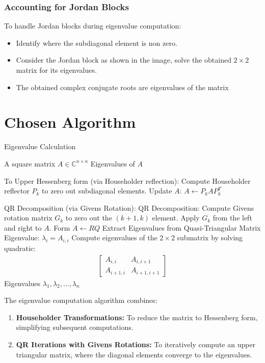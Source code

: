 \documentclass[12pt]{article}
\begin{document}
\subsubsection{Accounting for Jordan Blocks}
To handle Jordan blocks during eigenvalue computation:
\begin{itemize}
    \item Identify where the subdiagonal element is non zero.
    \item Consider the Jordan block as shown in the image, solve the obtained $2\times2$ matrix for its eigenvalues.
    \item The obtained complex conjugate roots are eigenvalues of the matrix
\end{itemize}

\section{Chosen Algorithm}
\begin{algorithm}[H]
\caption{Eigenvalue Calculation}
\begin{algorithmic}[1]
\REQUIRE A square matrix $A \in \mathbb{C}^{n \times n}$
\ENSURE Eigenvalues of $A$

\STATE To Upper Hessenberg form (via Householder reflection):
        \STATE Compute Householder reflector $P_k$ to zero out subdiagonal elements.
        \STATE Update $A$: $A \leftarrow P_k A P_k^T$
    \ENDFOR

\STATE QR Decomposition (via Givens Rotation):
    \STATE QR Decomposition:
            \STATE Compute Givens rotation matrix $G_k$ to zero out the $(k+1, k)$ element.
            \STATE Apply $G_k$ from the left and right to $A$.
        \ENDFOR
    \STATE Form $A \leftarrow R Q$
\ENDWHILE
\STATE Extract Eigenvalues from Quasi-Triangular Matrix
            \STATE Eigenvalue: $\lambda_i = A_{i, i}$
        \ELSE
            \STATE Compute eigenvalues of the $2 \times 2$ submatrix by solving quadratic:
            \begin{align*}
            \begin{bmatrix}
                A_{i, i} & A_{i, i+1} \\
                A_{i+1, i} & A_{i+1, i+1}
            \end{bmatrix}
            \end{align*}
        \ENDIF
    \ENDFOR
\RETURN Eigenvalues $\lambda_1, \lambda_2, ..., \lambda_n$
\end{algorithmic}
\end{algorithm}
The eigenvalue computation algorithm combines:
\begin{enumerate}
    \item \textbf{Householder Transformations:} To reduce the matrix to Hessenberg form, simplifying subsequent computations.
    \item \textbf{QR Iterations with Givens Rotations:} To iteratively compute an upper triangular matrix, where the diagonal elements converge to the eigenvalues.
\end{enumerate}
\end{document}
